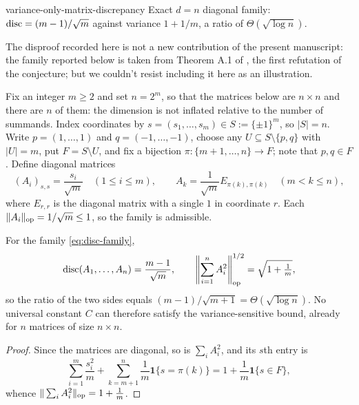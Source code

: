 \begin{cxcertificate}{variance-only-matrix-discrepancy}
Exact $d=n$ diagonal family: $\operatorname{disc}=(m-1)/\sqrt m$ against variance $1+1/m$, a ratio of $\Theta(\sqrt{\log n})$.
\end{cxcertificate}

\begin{cxrefutation}
The disproof recorded here is not a new contribution of the present manuscript: the family reported below is taken from Theorem A.1 of \citet{AkbasSra2026}, the first refutation of the conjecture; but we couldn't resist including it here as an illustration.

Fix an integer $m\ge2$ and set $n=2^m$, so that the matrices below are $n\times n$ and there are $n$ of them: the dimension is not inflated relative to the number of summands.  Index coordinates by $s=(s_1,\ldots,s_m)\in S:=\{\pm1\}^m$, so $|S|=n$.  Write $p=(1,\ldots,1)$ and $q=(-1,\ldots,-1)$, choose any $U\subseteq S\setminus\{p,q\}$ with $|U|=m$, put $F=S\setminus U$, and fix a bijection $\pi:\{m+1,\ldots,n\}\to F$; note that $p,q\in F$.  Define diagonal matrices
\begin{equation}\label{eq:disc-family}
(A_i)_{s,s}=\frac{s_i}{\sqrt m}\quad(1\le i\le m),
\qquad
A_k=\frac1{\sqrt m}E_{\pi(k),\pi(k)}\quad(m<k\le n),
\end{equation}
where $E_{r,r}$ is the diagonal matrix with a single $1$ in coordinate $r$.  Each $\|A_i\|_{\rm op}=1/\sqrt m\le1$, so the family is admissible.

\begin{theorem}\label{thm:discrepancy}
For the family \eqref{eq:disc-family},
\[
\operatorname{disc}(A_1,\ldots,A_n)=\frac{m-1}{\sqrt m},
\qquad
\left\|\sum_{i=1}^nA_i^2\right\|_{\rm op}^{1/2}=\sqrt{1+\tfrac1m},
\]
so the ratio of the two sides equals $(m-1)/\sqrt{m+1}=\Theta(\sqrt{\log n})$.  No universal constant $C$ can therefore satisfy the variance-sensitive bound, already for $n$ matrices of size $n\times n$.
\end{theorem}
\begin{proof}
Since the matrices are diagonal, so is $\sum_iA_i^2$, and its $s$th entry is
\[
\sum_{i=1}^m\frac{s_i^2}m+\sum_{k=m+1}^n\frac1m\mathbf 1\{s=\pi(k)\}=1+\frac1m\mathbf 1\{s\in F\},
\]
whence $\|\sum_iA_i^2\|_{\rm op}=1+\frac1m$.


\end{proof}
\end{cxrefutation}
